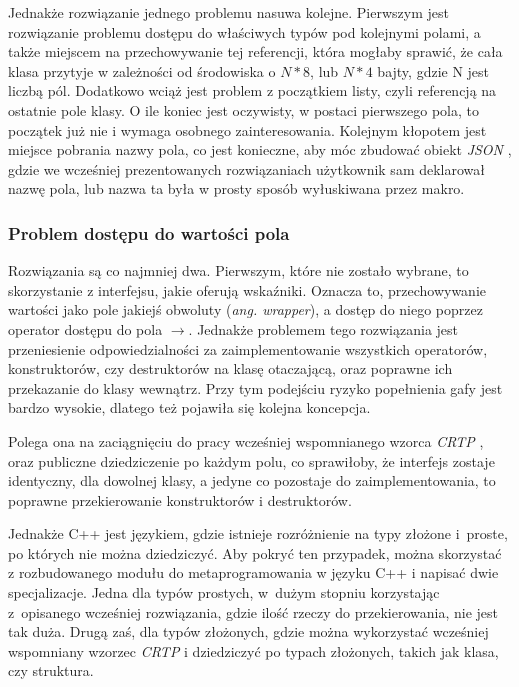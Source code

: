 \documentclass[12pt]{article}
\newcommand{\n}{\newline}
\newcommand{\nonpl}[1]{{\it #1}}
\newcommand{\ang}[1]{\nonpl{ang. #1}}
\newcommand{\JSON}{\nonpl{JSON} }
\newcommand{\CRTP}{\nonpl{CRTP} }
\begin{document}
{{			Jednakże rozwiązanie jednego problemu nasuwa kolejne. Pierwszym jest rozwiązanie problemu dostępu do właściwych typów pod kolejnymi polami, a także
			miejscem na przechowywanie tej referencji, która mogłaby sprawić, że cała klasa przytyje w zależności od środowiska o $N * 8$, lub $N * 4$ bajty,
			gdzie N jest liczbą pól. Dodatkowo wciąż jest problem z początkiem listy, czyli referencją na ostatnie pole klasy. O ile koniec jest oczywisty,
			w postaci pierwszego pola, to początek już nie i wymaga osobnego zainteresowania. Kolejnym kłopotem jest miejsce pobrania nazwy pola, co jest
			konieczne, aby móc zbudować obiekt \JSON, gdzie we wcześniej prezentowanych rozwiązaniach użytkownik sam deklarował nazwę pola, lub nazwa ta
			była w prosty sposób wyłuskiwana przez makro.\n

			{
				\subsubsection{Problem dostępu do wartości pola}

				Rozwiązania są co najmniej dwa. Pierwszym, które nie zostało wybrane, to skorzystanie z interfejsu, jakie oferują wskaźniki. Oznacza to,
				przechowywanie wartości jako pole jakiejś obwoluty (\ang{wrapper}), a dostęp do niego poprzez operator dostępu do pola $\rightarrow$. Jednakże problemem
				tego rozwiązania jest przeniesienie odpowiedzialności za zaimplementowanie wszystkich operatorów, konstruktorów, czy destruktorów
				na klasę otaczającą, oraz poprawne ich przekazanie do klasy wewnątrz. Przy tym podejściu ryzyko popełnienia gafy jest bardzo wysokie, dlatego też
				pojawiła się kolejna koncepcja.\n

				Polega ona na zaciągnięciu do pracy wcześniej wspomnianego wzorca \CRTP, oraz publiczne dziedziczenie po każdym polu, co sprawiłoby, że
				interfejs zostaje identyczny, dla dowolnej klasy, a jedyne co pozostaje do zaimplementowania, to poprawne przekierowanie konstruktorów
				i destruktorów.\n

				Jednakże C++ jest językiem, gdzie istnieje rozróżnienie na typy złożone i~proste, po których nie można dziedziczyć. Aby pokryć ten przypadek,
				można skorzystać z rozbudowanego modułu do metaprogramowania w języku C++ i napisać dwie specjalizacje. Jedna dla typów prostych, w~dużym stopniu
				korzystając z~opisanego wcześniej rozwiązania, gdzie ilość rzeczy do przekierowania, nie jest tak duża. Drugą zaś, dla typów złożonych,
				gdzie można wykorzystać wcześniej wspomniany wzorzec \CRTP i dziedziczyć po typach złożonych, takich jak klasa, czy struktura.\n

}}}
\end{document}
